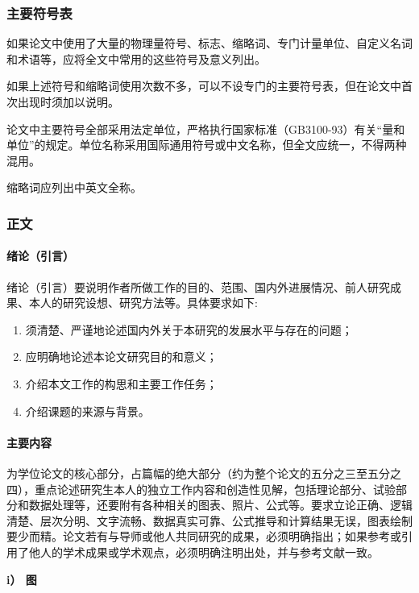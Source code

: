 \subsubsection{主要符号表}
如果论文中使用了大量的物理量符号、标志、缩略词、专门计量单位、自定义名词和术语等，应将全文中常用的这些符号及意义列出。

如果上述符号和缩略词使用次数不多，可以不设专门的主要符号表，但在论文中首次出现时须加以说明。

论文中主要符号全部采用法定单位，严格执行国家标准（GB3100-93）有关“量和单位”的规定。单位名称采用国际通用符号或中文名称，但全文应统一，不得两种混用。

缩略词应列出中英文全称。

\subsubsection{正文}

\paragraph{绪论（引言）}
绪论（引言）要说明作者所做工作的目的、范围、国内外进展情况、前人研究成果、本人的研究设想、研究方法等。具体要求如下:

\begin{enumerate}[1)]
    \item 须清楚、严谨地论述国内外关于本研究的发展水平与存在的问题；
    \item 应明确地论述本论文研究目的和意义；
    \item 介绍本文工作的构思和主要工作任务；
    \item 介绍课题的来源与背景。
\end{enumerate}

\paragraph{主要内容}
为学位论文的核心部分，占篇幅的绝大部分（约为整个论文的五分之三至五分之四），重点论述研究生本人的独立工作内容和创造性见解，包括理论部分、试验部分和数据处理等，还要附有各种相关的图表、照片、公式等。要求立论正确、逻辑清楚、层次分明、文字流畅、数据真实可靠、公式推导和计算结果无误，图表绘制要少而精。论文若有与导师或他人共同研究的成果，必须明确指出；如果参考或引用了他人的学术成果或学术观点，必须明确注明出处，并与参考文献一致。

{\bf i） 图}

